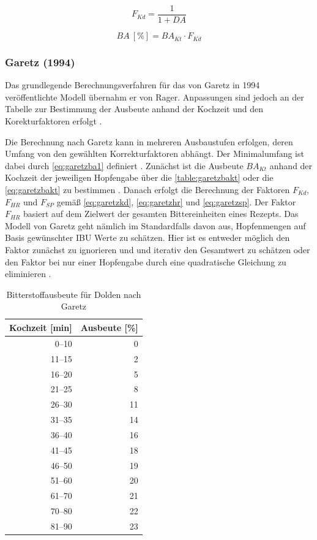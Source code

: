 \documentclass[a4paper,parskip=half]{scrartcl}
\newcommand{\BA}{\mathit{BA}}
\newcommand{\BAKt}{{\mathit{BA}}_{\mathit{Kt}}}
\newcommand{\uper}{\:[\text{\%}]}
\newcommand{\FKd}{F_{\mathit{Kd}}}
\newcommand{\FHR}{F_{\mathit{HR}}}
\newcommand{\FSP}{F_{\mathit{SP}}}
\begin{document}
\begin{equation}
\FKd = \frac{1}{1 + \mathit{DA}}
\label{eq:ragerfkd}
\end{equation}


\begin{equation}
\BA \uper = \BAKt \cdot \FKd
\label{eq:ragerba}
\end{equation}

\subsubsection*{Garetz (1994)}

Das grundlegende Berechnungsverfahren für das von Garetz in 1994
veröffentlichte Modell übernahm er von Rager. Anpassungen sind jedoch an
der Tabelle zur Bestimmung der Ausbeute anhand der Kochzeit und den
Korekturfaktoren erfolgt \parencite[134-144]{Garetz1994}.

Die Berechnung nach Garetz kann in mehreren Ausbaustufen erfolgen,
deren Umfang von den gewählten Korrekturfaktoren abhängt.
Der Minimalumfang ist dabei durch \autoref{eq:garetzba1} definiert
\parencite[137]{Garetz1994}.
Zunächst ist die Ausbeute $\BAKt$ anhand der Kochzeit der jeweiligen 
Hopfengabe über die \autoref{table:garetzbakt} oder die \autoref{eq:garetzbakt} zu bestimmen \parencite{Steinmeyer2021}. Danach erfolgt die
Berechnung der Faktoren $\FKd$, $\FHR$ und $\FSP$ gemäß
\autoref{eq:garetzkd}, \autoref{eq:garetzhr} und \autoref{eq:garetzsp}.
Der Faktor $\FHR$ basiert auf dem Zielwert der gesamten Bittereinheiten
eines Rezepts. Das Modell von Garetz geht nämlich im Standardfalls
davon aus, Hopfenmengen auf Basis gewünschter IBU Werte zu schätzen.
Hier ist es entweder möglich den Faktor zunächst zu ignorieren und
und iterativ den Gesamtwert zu schätzen oder den Faktor bei nur
einer Hopfengabe durch eine quadratische Gleichung zu eliminieren      \parencite[63]{Hall1997}.

\begin{table}[H]
\centering
\begin{tabular}{rr}
\toprule
\multicolumn{1}{c}{\textbf{Kochzeit [min]}} & \multicolumn{1}{c}{\textbf{Ausbeute [\%]}} \\
\midrule
0–10            & 0 \\
11–15           & 2 \\
16–20           & 5 \\
21–25           & 8 \\
26–30           & 11 \\
31–35           & 14 \\
36–40           & 16 \\
41–45           & 18 \\
46–50           & 19 \\
51–60           & 20 \\
61–70           & 21 \\
70–80           & 22 \\
81–90           & 23 \\
\bottomrule
\end{tabular}
\caption{Bitterstoffausbeute für Dolden nach Garetz \parencite[138]{Garetz1994}}
\label{table:garetzbakt}
\end{table}
\end{document}
